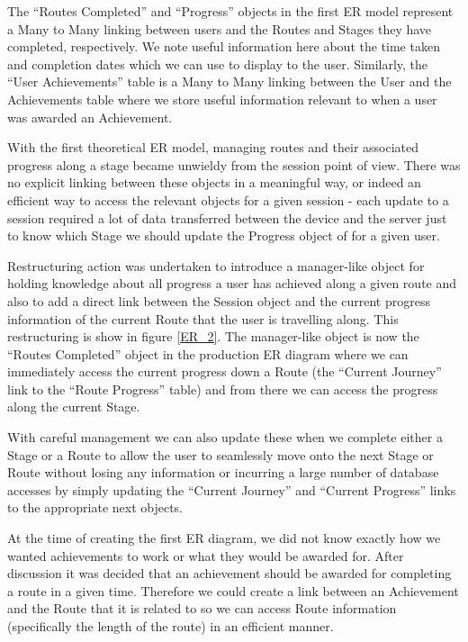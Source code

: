 The ``Routes Completed'' and ``Progress'' objects in the first ER
model represent a Many to Many linking between users and the Routes
and Stages they have completed, respectively. We note useful
information here about the time taken and completion dates which we
can use to display to the user. Similarly, the ``User Achievements''
table is a Many to Many linking between the User and the Achievements
table where we store useful information relevant to when a user was
awarded an Achievement.  

With the first theoretical ER model, managing routes and their
associated progress along a stage became unwieldy from the session
point of view. There was no explicit linking between these objects in
a meaningful way, or indeed an efficient way to access the relevant
objects for a given session - each update to a session required a lot
of data transferred between the device and the server just to know
which Stage we should update the Progress object of for a given user.

Restructuring action was undertaken to introduce a manager-like object
for holding knowledge about all progress a user has achieved along a
given route and also to add a direct link between the Session object
and the current progress information of the current Route that the
user is travelling along. This restructuring is show in figure
\ref{ER_2}. The manager-like object is now the ``Routes Completed''
object in the production ER diagram where we can immediately access
the current progress down a Route (the ``Current Journey'' link to the
``Route Progress'' table) and from there we can access the progress
along the current Stage. 

With careful management we can also update these when we complete
either a Stage or a Route to allow the user to seamlessly move onto
the next Stage or Route without losing any information or incurring a
large number of database accesses by simply updating the ``Current
Journey'' and ``Current Progress'' links to the appropriate next
objects. 

At the time of creating the first ER diagram, we did not know exactly
how we wanted achievements to work or what they would be awarded
for. After discussion it was decided that an achievement should be
awarded for completing a route in a given time. Therefore we could
create a link between an Achievement and the Route that it is related
to so we can access Route information (specifically the length of the
route) in an efficient manner. 

